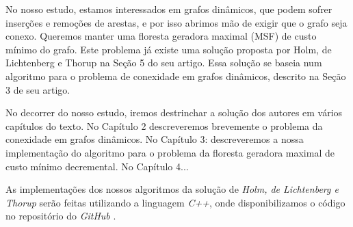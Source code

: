 No nosso estudo, estamos interessados em grafos dinâmicos, que podem sofrer inserções e remoções de arestas, e por isso abrimos mão de exigir que o grafo seja conexo. Queremos manter uma floresta geradora maximal (MSF) de custo mínimo do grafo. Este problema já existe uma solução proposta por Holm, de Lichtenberg e Thorup \cite{jacob_holm} na Seção 5 do seu artigo. Essa solução se baseia num algoritmo para o problema de conexidade em grafos dinâmicos, descrito na Seção 3 de seu artigo. 

No decorrer do nosso estudo, iremos destrinchar a solução dos autores em vários capítulos do texto. No Capítulo 2 descreveremos brevemente o problema da conexidade em grafos dinâmicos. No Capítulo 3: descreveremos a nossa implementação do algoritmo para o problema da floresta geradora maximal de custo mínimo decremental. No Capítulo 4...

As implementações dos nossos algoritmos da solução de \textit{Holm, de Lichtenberg e Thorup} \cite{jacob_holm} serão feitas utilizando a linguagem \textit{C++}, onde disponibilizamos o código no repositório do \textit{GitHub} \cite{chung2025}.